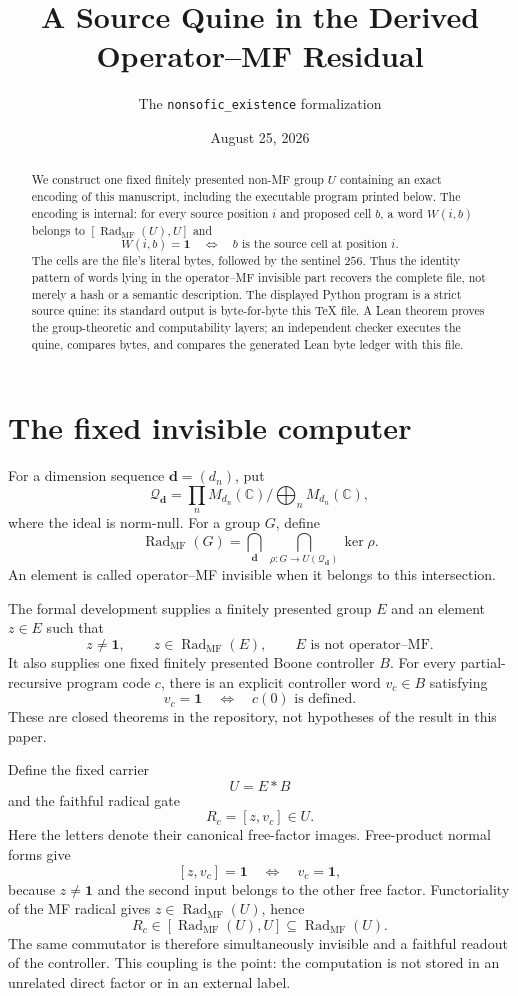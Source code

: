 \documentclass[11pt]{article}
\title{A Source Quine in the Derived Operator--MF Residual}
\author{The \texttt{nonsofic\_existence} formalization}
\date{August 25, 2026}
\newcommand{\RadMF}{\operatorname{Rad}_{\mathrm{MF}}}
\newcommand{\Qd}{\mathcal Q_{\mathbf d}}
\newcommand{\one}{\mathbf 1}
\begin{document}
\maketitle

\begin{abstract}
We construct one fixed finitely presented non-MF group $U$ containing an
exact encoding of this manuscript, including the executable program printed
below.  The encoding is internal: for every source position $i$ and proposed
cell $b$, a word $W(i,b)$ belongs to
$[\RadMF(U),U]$ and
\[
  W(i,b)=\one \quad\Longleftrightarrow\quad
  b\text{ is the source cell at position }i.
\]
The cells are the file's literal bytes, followed by the sentinel $256$.
Thus the identity pattern of words lying in the operator--MF invisible part
recovers the complete file, not merely a hash or a semantic description.
The displayed Python program is a strict source quine: its standard output is
byte-for-byte this TeX file.  A Lean theorem proves the group-theoretic and
computability layers; an independent checker executes the quine, compares
bytes, and compares the generated Lean byte ledger with this file.
\end{abstract}

\section{The fixed invisible computer}

For a dimension sequence $\mathbf d=(d_n)$, put
\[
 \Qd=\prod_n M_{d_n}(\mathbb C)\big/\bigoplus_n M_{d_n}(\mathbb C),
\]
where the ideal is norm-null.  For a group $G$, define
\[
 \RadMF(G)=\bigcap_{\mathbf d}\ \bigcap_{\rho:G\to U(\Qd)}\ker\rho.
\]
An element is called operator--MF invisible when it belongs to this
intersection.

The formal development supplies a finitely presented group $E$ and an element
$z\in E$ such that
\[
 z\ne\one,\qquad z\in\RadMF(E),\qquad E\text{ is not operator--MF}.
\]
It also supplies one fixed finitely presented Boone controller $B$.  For every
partial-recursive program code $c$, there is an explicit controller word
$v_c\in B$ satisfying
\[
 v_c=\one\quad\Longleftrightarrow\quad c(0)\text{ is defined}.
\]
These are closed theorems in the repository, not hypotheses of the result in
this paper.

Define the fixed carrier
\[
 U=E*B
\]
and the faithful radical gate
\[
 R_c=[z,v_c]\in U.
\]
Here the letters denote their canonical free-factor images.  Free-product
normal forms give
\[
 [z,v_c]=\one\quad\Longleftrightarrow\quad v_c=\one,
\]
because $z\ne\one$ and the second input belongs to the other free factor.
Functoriality of the MF radical gives $z\in\RadMF(U)$, hence
\[
 R_c\in[\RadMF(U),U]\subseteq\RadMF(U).
\]
The same commutator is therefore simultaneously invisible and a faithful
readout of the controller.  This coupling is the point: the computation is
not stored in an unrelated direct factor or in an external label.
\end{document}
